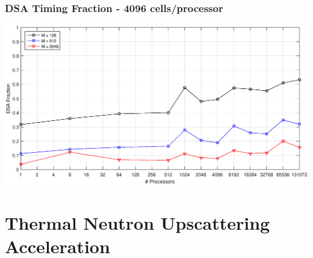 \documentclass[compress,10pt]{beamer}
\begin{document}
\begin{frame}[t]
{}
{
\frametitle{DSA Timing Fraction - 4096 cells/processor}
\centering
\includegraphics[width=\textwidth]{images/C4096.eps}
}
\end{frame}
\typeout{***********************************************************************************}
\section[Upscattering Acceleration]{Thermal Neutron Upscattering Acceleration}
\end{document}
